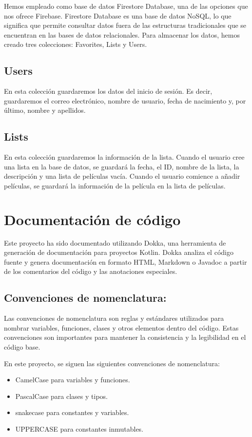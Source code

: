 \documentclass{article}
\begin{document}
    Hemos empleado como base de datos Firestore Database, una de las opciones que nos ofrece Firebase. Firestore Database es una base de datos NoSQL, lo que significa que permite consultar datos fuera de las estructuras tradicionales que se encuentran en las bases de datos relacionales. Para almacenar los datos, hemos creado tres colecciones: Favorites, Lists y Users.
    
    \subsection{Users}
    En esta colección guardaremos los datos del inicio de sesión. Es decir, guardaremos el correo electrónico, nombre de usuario, fecha de nacimiento y, por último, nombre y apellidos.
    
    \subsection{Lists}
    En esta colección guardaremos la información de la lista. Cuando el usuario cree una lista en la base de datos, se guardará la fecha, el ID, nombre de la lista, la descripción y una lista de películas vacía. Cuando el usuario comience a añadir películas, se guardará la información de la película en la lista de películas.

\section{Documentación de código}

Este proyecto ha sido documentado utilizando Dokka, una herramienta de generación de documentación para proyectos Kotlin. Dokka analiza el código fuente y genera documentación en formato HTML, Markdown o Javadoc a partir de los comentarios del código y las anotaciones especiales.

\subsection{Convenciones de nomenclatura:}

    Las convenciones de nomenclatura son reglas y estándares utilizados para nombrar variables, funciones, clases y otros elementos dentro del código. Estas convenciones son importantes para mantener la consistencia y la legibilidad en el código base.

    En este proyecto, se siguen las siguientes convenciones de nomenclatura:

    \begin{itemize}
        \item CamelCase para variables y funciones.
        \item PascalCase para clases y tipos.
        \item snake\textunderscore case para constantes y variables.
        \item UPPERCASE para constantes inmutables.
    \end{itemize}
\end{document}

